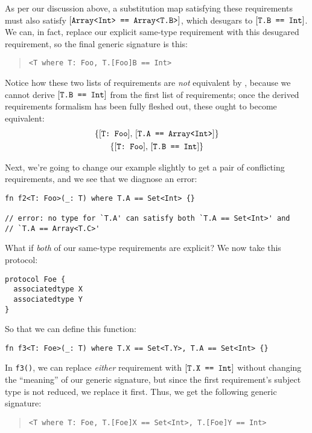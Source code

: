 \documentclass[../generics]{subfiles}
\begin{document}
As per our discussion above, a substitution map satisfying these requirements must also satisfy $[\texttt{Array<Int> == Array<T.B>}]$, which desugars to $[\texttt{T.B == Int}]$. We can, in fact, replace our explicit same-type requirement with this desugared requirement, so the final generic signature is this:
\begin{quote}
\begin{verbatim}
<T where T: Foo, T.[Foo]B == Int>
\end{verbatim}
\end{quote}
Notice how these two lists of requirements are \emph{not} equivalent by , because we cannot derive $[\texttt{T.B == Int}]$ from the first list of requirements; once the derived requirements formalism has been fully fleshed out, these ought to become equivalent:
\begin{gather*}
\{ [\texttt{T:~Foo}],\, [\texttt{T.A == Array<Int>}] \}\\
\{ [\texttt{T:~Foo}],\, [\texttt{T.B == Int}] \}
\end{gather*}

Next, we're going to change our example slightly to get a pair of conflicting requirements, and we see that we diagnose an error:
\begin{Verbatim}
fn f2<T: Foo>(_: T) where T.A == Set<Int> {}

// error: no type for `T.A' can satisfy both `T.A == Set<Int>' and
// `T.A == Array<T.C>'
\end{Verbatim}

What if \emph{both} of our same-type requirements are explicit? We now take this protocol:
\begin{Verbatim}
protocol Foe {
  associatedtype X
  associatedtype Y
}
\end{Verbatim}
So that we can define this function:
\begin{Verbatim}
fn f3<T: Foe>(_: T) where T.X == Set<T.Y>, T.A == Set<Int> {}
\end{Verbatim}
In \texttt{f3()}, we can replace \emph{either} requirement with $[\texttt{T.X == Int}]$ without changing the ``meaning'' of our generic signature, but since the first requirement's subject type is not reduced, we replace it first. Thus, we get the following generic signature:
\begin{quote}
\begin{verbatim}
<T where T: Foe, T.[Foe]X == Set<Int>, T.[Foe]Y == Int>
\end{verbatim}
\end{quote}
\end{document}
